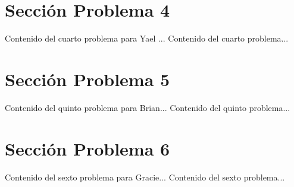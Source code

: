\documentclass{IEEEcsmag}
\begin{document}
\section{Sección Problema 4}
Contenido del cuarto problema para Yael ...
\newpage 
Contenido del cuarto problema...
\newpage 


\section{Sección Problema 5}
Contenido del quinto problema para Brian...
\newpage 
Contenido del quinto problema...
\newpage 


\section{Sección Problema 6}
Contenido del sexto problema para Gracie...
\newpage 
Contenido del sexto problema...
\newpage 
\end{document}
